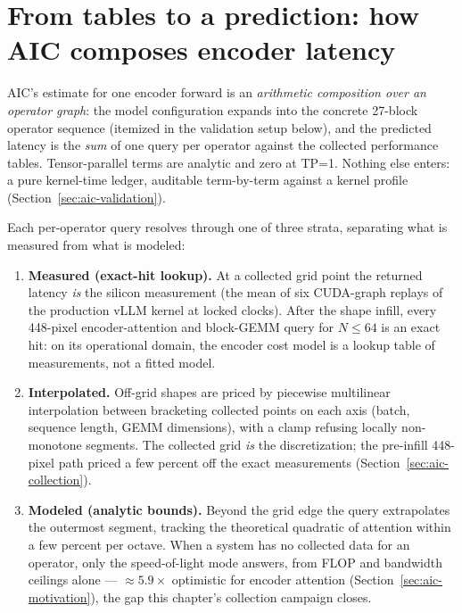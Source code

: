 {\renewcommand{\sectionmark}[1]{}%
\section{From tables to a prediction: how AIC composes encoder latency}%
\label{sec:aic-composition}}

AIC's estimate for one encoder forward is an \emph{arithmetic composition
over an operator graph}: the model configuration expands into the concrete
27-block operator sequence (itemized in the validation setup below), and the
predicted latency is the \emph{sum} of one query per operator against the
collected performance tables. Tensor-parallel terms are analytic and zero at
TP=1. Nothing else enters: a pure kernel-time ledger, auditable term-by-term
against a kernel profile (Section~\ref{sec:aic-validation}).

Each per-operator query resolves through one of three strata, separating
what is measured from what is modeled:

\begin{enumerate}
\item \textbf{Measured (exact-hit lookup).} At a collected grid point the
returned latency \emph{is} the silicon measurement (the mean of six
CUDA-graph replays of the production vLLM kernel at locked clocks). After the
shape infill, every 448-pixel encoder-attention and block-GEMM query for
$N \le 64$ is an exact hit: on its operational domain, the encoder cost model
is a lookup table of measurements, not a fitted model.
\item \textbf{Interpolated.} Off-grid shapes are priced by piecewise
multilinear interpolation between bracketing collected points on each axis
(batch, sequence length, GEMM dimensions), with a clamp refusing locally
non-monotone segments. The collected grid \emph{is} the discretization; the
pre-infill 448-pixel path priced a few percent off the exact measurements
(Section~\ref{sec:aic-collection}).
\item \textbf{Modeled (analytic bounds).} Beyond the grid edge the query
extrapolates the outermost segment, tracking the theoretical quadratic of
attention within a few percent per octave. When a system has no collected
data for an operator, only the speed-of-light mode answers, from FLOP and
bandwidth ceilings alone --- ${\approx}5.9\times$ optimistic for encoder
attention (Section~\ref{sec:aic-motivation}), the gap this chapter's
collection campaign closes.
\end{enumerate}

